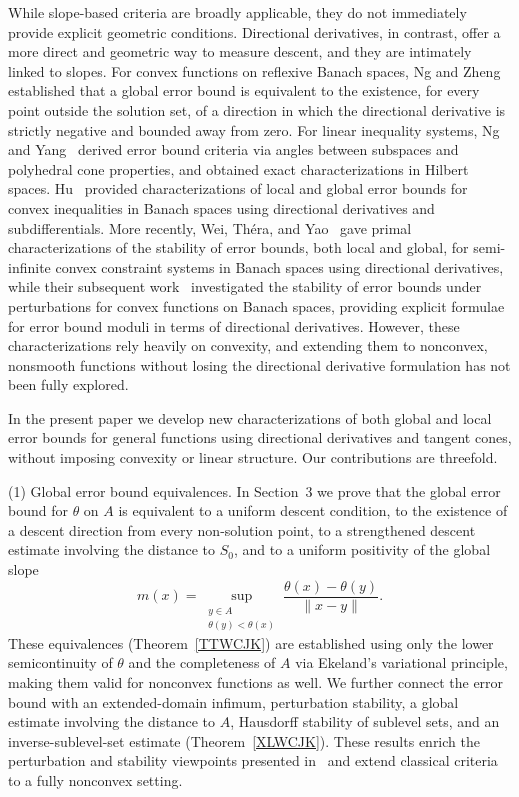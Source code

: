 \documentclass[11pt]{article}
\begin{document}
While slope-based criteria are broadly applicable, they do not immediately provide explicit geometric conditions. Directional derivatives, in contrast, offer a more direct and geometric way to measure descent, and they are intimately linked to slopes.  For convex functions on reflexive Banach spaces, Ng and Zheng~\cite{NgZheng} established that a global error bound is equivalent to the existence, for every point outside the solution set, of a direction in which the directional derivative is strictly negative and bounded away from zero.   For linear inequality systems, Ng and Yang~\cite{NgYang2002} derived error bound criteria via angles between subspaces and polyhedral cone properties, and obtained exact characterizations in Hilbert spaces.     Hu~\cite{Hu2007} provided characterizations of local and global error bounds for convex inequalities in Banach spaces using directional derivatives and subdifferentials. 
More recently, Wei, Théra, and Yao~\cite{WeiTheraYao2024} gave primal characterizations of
the stability of error bounds, both local and global, for semi-infinite convex constraint systems in Banach spaces  using directional derivatives, while their subsequent work~\cite{WeiTheraYao2025} investigated the stability of error bounds under perturbations for convex functions on Banach spaces, providing explicit formulae for error bound moduli in terms of directional derivatives. However, these characterizations rely heavily on convexity, and extending them to nonconvex, nonsmooth functions without losing the directional derivative formulation has not been fully explored.


In the present paper we develop new characterizations of both global and local error bounds for general  functions using directional derivatives and tangent cones, without imposing convexity or linear structure. 
Our contributions are threefold.

(1) Global error bound equivalences.  In Section~3 we prove that the global error bound for \(\theta\) on \(A\) is equivalent to a uniform descent condition, to the existence of a descent direction from every non-solution point, to a strengthened descent estimate involving the distance to \(S_0\), and to a uniform positivity of the global slope 
\[
m(x) = \sup_{\substack{y\in A\\ \theta(y)<\theta(x)}} \frac{\theta(x)-\theta(y)}{\|x-y\|}.
\]
These equivalences (Theorem~\ref{TTWCJK}) are established using only the lower semicontinuity of \(\theta\) and the completeness of \(A\) via Ekeland's variational principle, making them valid for nonconvex functions as well.  We further connect the error bound with an extended-domain infimum, perturbation stability, a global estimate involving the distance to \(A\), Hausdorff stability of sublevel sets, and an inverse-sublevel-set estimate (Theorem~\ref{XLWCJK}). These results  enrich the perturbation and stability viewpoints presented in~\cite{KLT2018,Kruger,KNT2010,VanNgai2010} and extend classical criteria to a fully nonconvex setting.
\end{document}
